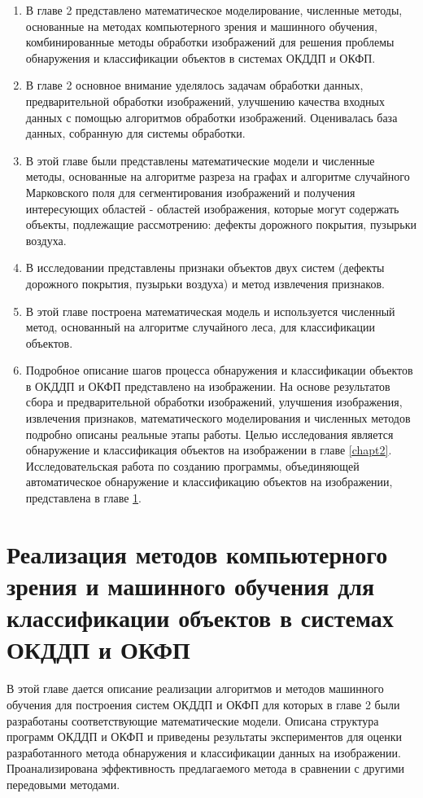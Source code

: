 \documentclass[a4paper,14pt]{extreport}
\begin{document}
\begin{enumerate}
	\item В главе 2 представлено математическое моделирование, численные методы, основанные на методах компьютерного зрения и машинного обучения, комбинированные методы обработки изображений для решения проблемы обнаружения и классификации объектов в системах ОКДДП и ОКФП.
\item  В главе 2 основное внимание уделялось задачам обработки данных, предварительной обработки изображений, улучшению качества входных данных с помощью алгоритмов обработки изображений. Оценивалась база данных, собранную для системы обработки.
\item В этой главе были представлены математические модели и численные методы, основанные на алгоритме разреза на графах и алгоритме случайного Марковского поля для сегментирования изображений и получения интересующих областей - областей изображения, которые могут содержать объекты, подлежащие рассмотрению: дефекты дорожного покрытия, пузырьки воздуха.
\item В исследовании представлены признаки объектов двух систем (дефекты дорожного покрытия, пузырьки воздуха) и метод извлечения признаков.
\item В этой главе построена математическая модель и используется численный метод, основанный на алгоритме случайного леса, для классификации объектов.
\item Подробное описание шагов процесса обнаружения и классификации объектов в ОКДДП и ОКФП представлено на изображении.
На основе результатов сбора и предварительной обработки изображений, улучшения изображения, извлечения признаков, математического моделирования и численных методов подробно описаны реальные этапы работы. Целью исследования является обнаружение и классификация объектов на изображении в главе \ref{chapt2}. Исследовательская работа по созданию программы, объединяющей автоматическое обнаружение и классификацию объектов на изображении, представлена в главе \ref{chapt3}.

\end{enumerate}


\chapter{Реализация методов компьютерного зрения и машинного обучения для классификации объектов в системах ОКДДП и ОКФП} \label{chapt3}
В этой главе дается описание реализации алгоритмов и методов машинного обучения для построения систем ОКДДП и ОКФП для которых в главе 2 были разработаны соответствующие математические модели. Описана структура программ ОКДДП и ОКФП и приведены результаты экспериментов для оценки разработанного метода обнаружения и классификации данных на изображении. Проанализирована эффективность предлагаемого метода в сравнении с другими передовыми методами. 
\end{document}

